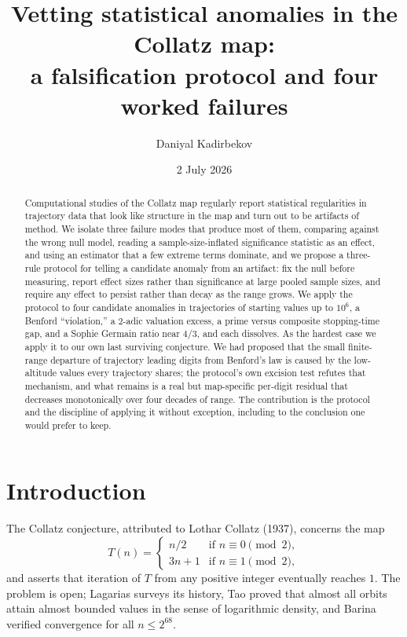 \documentclass[11pt]{amsart}
\title[Vetting Collatz anomalies]{Vetting statistical anomalies in the Collatz map:\\ a falsification protocol and four worked failures}
\author{Daniyal Kadirbekov}
\date{2 July 2026}
\begin{document}
\begin{abstract}
Computational studies of the Collatz map regularly report statistical regularities in trajectory data that look like structure in the map and turn out to be artifacts of method. We isolate three failure modes that produce most of them, comparing against the wrong null model, reading a sample-size-inflated significance statistic as an effect, and using an estimator that a few extreme terms dominate, and we propose a three-rule protocol for telling a candidate anomaly from an artifact: fix the null before measuring, report effect sizes rather than significance at large pooled sample sizes, and require any effect to persist rather than decay as the range grows. We apply the protocol to four candidate anomalies in trajectories of starting values up to $10^6$, a Benford ``violation,'' a $2$-adic valuation excess, a prime versus composite stopping-time gap, and a Sophie Germain ratio near $4/3$, and each dissolves. As the hardest case we apply it to our own last surviving conjecture. We had proposed that the small finite-range departure of trajectory leading digits from Benford's law is caused by the low-altitude values every trajectory shares; the protocol's own excision test refutes that mechanism, and what remains is a real but map-specific per-digit residual that decreases monotonically over four decades of range. The contribution is the protocol and the discipline of applying it without exception, including to the conclusion one would prefer to keep.
\end{abstract}

\maketitle

\section{Introduction}

The Collatz conjecture, attributed to Lothar Collatz (1937), concerns the map
\begin{equation}
T(n) =
\begin{cases}
n/2 & \text{if } n \equiv 0 \pmod 2,\\
3n+1 & \text{if } n \equiv 1 \pmod 2,
\end{cases}
\end{equation}
and asserts that iteration of $T$ from any positive integer eventually reaches $1$. The problem is open; Lagarias \cite{lagarias1985} surveys its history, Tao \cite{tao2019} proved that almost all orbits attain almost bounded values in the sense of logarithmic density, and Barina \cite{barina2021} verified convergence for all $n \le 2^{68}$.
\end{document}

